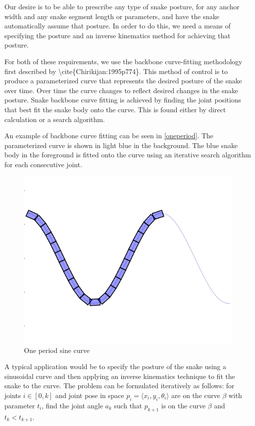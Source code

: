 Our desire is to be able to prescribe any type of snake posture, for any anchor width and any snake segment length or parameters, and have the snake automatically assume that posture. In order to do this, we need a means of specifying the posture and an inverse kinematics method for achieving that posture.

For both of these requirements, we use the backbone curve-fitting methodology first described by \textbackslash{}cite\{Chirikijan:1995p774\}. This method of control is to produce a parameterized curve that represents the desired posture of the snake over time. Over time the curve changes to reflect desired changes in the snake posture. Snake backbone curve fitting is achieved by finding the joint positions that best fit the snake body onto the curve. This is found either by direct calculation or a search algorithm.

An example of backbone curve fitting can be seen in \autoref{oneperiod}. The parameterized curve is shown in light blue in the background. The blue snake body in the foreground is fitted onto the curve using an iterative search algorithm for each consecutive joint. 

\begin{figure}[htbp]
\centering
\includegraphics[keepaspectratio,width=400pt,height=0.75\textheight]{OnePeriodCurve.png}
\caption{One period sine curve}
\label{oneperiod}
\end{figure}



A typical application would be to specify the posture of the snake using a sinusoidal curve and then applying an inverse kinematics technique to fit the snake to the curve. The problem can be formulated iteratively as follows: for joints $i \in [0,k]$ and joint pose in space $p_i = \langle x_i,y_i,\theta_i \rangle $ are on the curve $\beta$ with parameter $t_i$, find the joint angle $a_k$ such that $p_{k+1}$ is on the curve $\beta$ and $t_k < t_{k+1}$.

